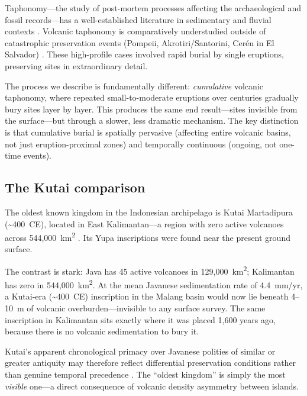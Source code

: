 \documentclass[12pt,a4paper]{article}
\begin{document}
Taphonomy---the study of post-mortem processes affecting the archaeological and fossil records---has a well-established literature in sedimentary and fluvial contexts \citep{schiffer1987}. Volcanic taphonomy is comparatively understudied outside of catastrophic preservation events (Pompeii, Akrotiri/Santorini, Cer\'{e}n in El Salvador) \citep{sigurdsson1985,doumas1983,sheets1992}. These high-profile cases involved rapid burial by single eruptions, preserving sites in extraordinary detail.

The process we describe is fundamentally different: \textit{cumulative} volcanic taphonomy, where repeated small-to-moderate eruptions over centuries gradually bury sites layer by layer. This produces the same end result---sites invisible from the surface---but through a slower, less dramatic mechanism. The key distinction is that cumulative burial is spatially pervasive (affecting entire volcanic basins, not just eruption-proximal zones) and temporally continuous (ongoing, not one-time events).

\subsection{The Kutai comparison}

The oldest known kingdom in the Indonesian archipelago is Kutai Martadipura (\textasciitilde400~CE), located in East Kalimantan---a region with zero active volcanoes across 544,000~km\textsuperscript{2} \citep{vogel1918}. Its Yupa inscriptions were found near the present ground surface.

The contrast is stark: Java has 45 active volcanoes in 129,000~km\textsuperscript{2}; Kalimantan has zero in 544,000~km\textsuperscript{2}. At the mean Javanese sedimentation rate of 4.4~mm/yr, a Kutai-era (\textasciitilde400~CE) inscription in the Malang basin would now lie beneath 4--10~m of volcanic overburden---invisible to any surface survey. The same inscription in Kalimantan sits exactly where it was placed 1,600 years ago, because there is no volcanic sedimentation to bury it.

Kutai's apparent chronological primacy over Javanese polities of similar or greater antiquity may therefore reflect differential preservation conditions rather than genuine temporal precedence \citep{coedes1968,miksic2004}. The ``oldest kingdom'' is simply the most \textit{visible} one---a direct consequence of volcanic density asymmetry between islands.

\end{document}
